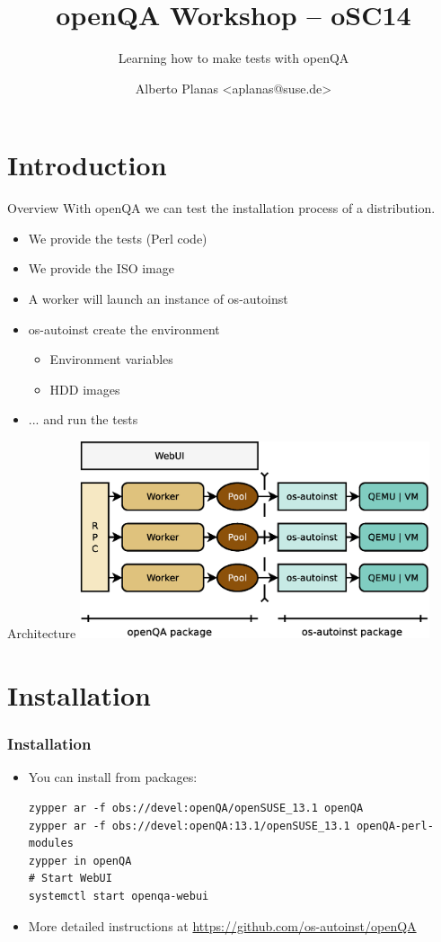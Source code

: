 \documentclass{beamer}
\author{Alberto Planas <aplanas@suse.de>\newline {\small openSUSE Team}}
\title{openQA Workshop -- oSC14}
\subtitle{Learning how to make tests with openQA}
\begin{document}
\begin{frame}[t,plain]
  \titlepage
\end{frame}


\section{Introduction}
%
%
\begin{frame}{Overview}
  With openQA we can test the installation process of a distribution.
  \begin{itemize}
  \item We provide the tests (Perl code)
  \item We provide the ISO image
  \item A worker will launch an instance of os-autoinst
  \item os-autoinst create the environment
    \begin{itemize}
    \item Environment variables
    \item HDD images
    \end{itemize}
  \item ... and run the tests
  \end{itemize}
\end{frame}

%
%
\begin{frame}{Architecture}
  \includegraphics[height=5.8cm,width=10.3cm]{arch}
\end{frame}


\section{Installation}
%
%
\begin{frame}[fragile]
  \frametitle{Installation}
  \begin{itemize}
  \item You can install from packages:
    \lstset{style=mybash}
    \begin{lstlisting}
zypper ar -f obs://devel:openQA/openSUSE_13.1 openQA
zypper ar -f obs://devel:openQA:13.1/openSUSE_13.1 openQA-perl-modules
zypper in openQA
# Start WebUI
systemctl start openqa-webui
    \end{lstlisting}
  \item More detailed instructions at \newline
    \url{https://github.com/os-autoinst/openQA}
  \end{itemize}
\end{frame}
\end{document}
